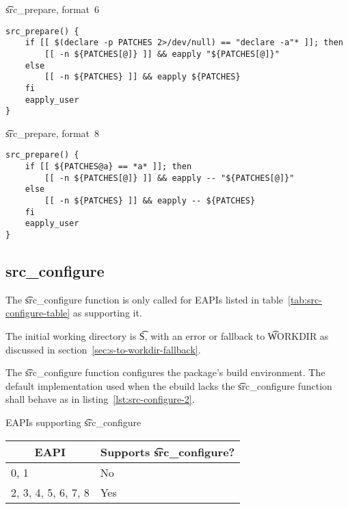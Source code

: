\begin{listing}[H]
\caption{\t{src_prepare}, format~6} \label{lst:src-prepare-6}
\begin{verbatim}
src_prepare() {
    if [[ $(declare -p PATCHES 2>/dev/null) == "declare -a"* ]]; then
        [[ -n ${PATCHES[@]} ]] && eapply "${PATCHES[@]}"
    else
        [[ -n ${PATCHES} ]] && eapply ${PATCHES}
    fi
    eapply_user
}
\end{verbatim}
\end{listing}

\begin{listing}[H]
\caption{\t{src_prepare}, format~8} \label{lst:src-prepare-8}
\begin{verbatim}
src_prepare() {
    if [[ ${PATCHES@a} == *a* ]]; then
        [[ -n ${PATCHES[@]} ]] && eapply -- "${PATCHES[@]}"
    else
        [[ -n ${PATCHES} ]] && eapply -- ${PATCHES}
    fi
    eapply_user
}
\end{verbatim}
\end{listing}

\subsection{src_configure}

 The \t{src_configure} function is only called for EAPIs listed in
table~\ref{tab:src-configure-table} as supporting it.

The initial working directory is \t{S}, with an error or fallback to \t{WORKDIR} as discussed in
section~\ref{sec:s-to-workdir-fallback}.

The \t{src_configure} function configures the package's build environment. The default
implementation used when the ebuild lacks the \t{src_configure} function shall behave as in
listing~\ref{lst:src-configure-2}.

\begin{centertable}{EAPIs supporting \t{src_configure}}
    \label{tab:src-configure-table}
    \begin{tabular}{ll}
      \toprule
      \multicolumn{1}{c}{\textbf{EAPI}} &
      \multicolumn{1}{c}{\textbf{Supports \t{src_configure}?}} \\
      \midrule
      0, 1                & No  \\
      2, 3, 4, 5, 6, 7, 8 & Yes \\
      \bottomrule
    \end{tabular}
\end{centertable}

